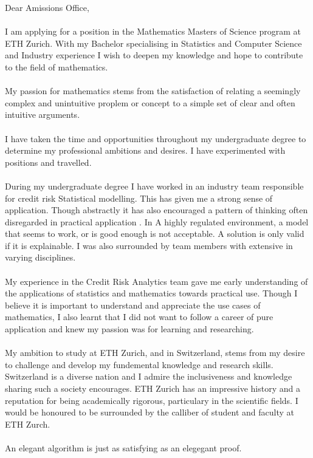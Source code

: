 Dear Amissions Office,\\
\\
I am applying for a position in the Mathematics Masters of Science program at ETH Zurich. With my Bachelor specialising in Statistics and Computer Science and Industry experience I wish to deepen my knowledge and hope to contribute to the field of mathematics.\\
\\
My passion for mathematics stems from the satisfaction of relating a seemingly complex and unintuitive proplem or concept to a simple set of clear and often intuitive arguments.\\
\\
I have taken the time and opportunities throughout my undergraduate degree to determine my professional ambitions and desires. I have experimented with positions and travelled.\\
\\
During my undergraduate degree I have worked in an industry team responsible for credit risk Statistical modelling. This has  given me a strong sense of application. Though abstractly it has also encouraged a pattern of thinking often disregarded in practical application . In A highly regulated environment, a model that seems to work, or is good enough is not acceptable. A solution is only valid if it is explainable. I was also surrounded by team members with extensive in varying disciplines. \\
\\
My experience in the Credit Risk Analytics team gave me early understanding of the applications of statistics and mathematics towards practical use. Though I believe it is important to understand and appreciate the use cases of mathematics, I also learnt that I did not want to follow a career of pure application and knew my passion was for learning and researching.\\ 
\\
My ambition to study at ETH Zurich, and in Switzerland, stems from my desire to challenge and develop my fundemental knowledge and research skills. Switzerland is a diverse nation and I admire the inclusiveness and knowledge sharing such a society encourages. ETH Zurich has an impressive history and a reputation for being academically rigorous, particulary in the scientific fields. I would be honoured to be surrounded by the calliber of student and faculty at ETH Zurch.\\
\\
An elegant algorithm is just as satisfying as an elegegant proof.\\
